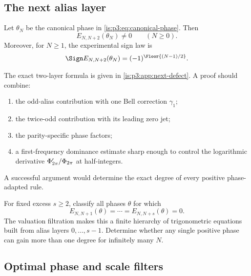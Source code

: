 \subsection{The next alias layer}

\begin{conjecture}
\label{is:p3:conj:next-defect-sign}
Let $\theta_N$ be the canonical phase in \eqref{is:p3:eq:canonical-phase}.  Then
\begin{equation}
 E_{N,N+2}(\theta_N)\ne0
 \qquad(N\ge0).
 \label{is:p3:eq:next-defect-nonzero}
\end{equation}
Moreover, for $N\ge1$, the experimental sign law is
\begin{equation}
 \Sign E_{N,N+2}(\theta_N)
 =(-1)^{\Floor{(N-1)/2}}.
 \label{is:p3:eq:next-defect-sign-conj}
\end{equation}
\end{conjecture}

The exact two-layer formula is given in \cref{is:p3:app:next-defect}.  A proof should combine:
\begin{enumerate}
\item the odd-alias contribution with one Bell correction $\gamma_1$;
\item the twice-odd contribution with its leading zero jet;
\item the parity-specific phase factors;
\item a first-frequency dominance estimate sharp enough to control the logarithmic derivative $\Phi_{2\pi}'/\Phi_{2\pi}$ at half-integers.
\end{enumerate}
A successful argument would determine the exact degree of every positive phase-adapted rule.

\begin{problem}
\label{is:p3:prob:higher-phase-gains}
For fixed excess $s\ge2$, classify all phases $\theta$ for which
\[
 E_{N,N+1}(\theta)=\cdots=E_{N,N+s}(\theta)=0.
\]
The valuation filtration makes this a finite hierarchy of trigonometric equations built from alias layers $0,\ldots,s-1$.  Determine whether any single positive phase can gain more than one degree for infinitely many $N$.
\end{problem}

\subsection{Optimal phase and scale filters}

